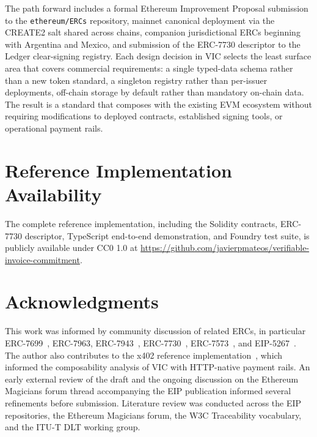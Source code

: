 \documentclass[11pt,a4paper]{article}
\begin{document}
The path forward includes a formal Ethereum Improvement Proposal submission to the \texttt{ethereum/ERCs} repository, mainnet canonical deployment via the CREATE2 salt shared across chains, companion jurisdictional ERCs beginning with Argentina and Mexico, and submission of the ERC-7730 descriptor to the Ledger clear-signing registry. Each design decision in VIC selects the least surface area that covers commercial requirements: a single typed-data schema rather than a new token standard, a singleton registry rather than per-issuer deployments, off-chain storage by default rather than mandatory on-chain data. The result is a standard that composes with the existing EVM ecosystem without requiring modifications to deployed contracts, established signing tools, or operational payment rails.

\section*{Reference Implementation Availability}

The complete reference implementation, including the Solidity contracts, ERC-7730 descriptor, TypeScript end-to-end demonstration, and Foundry test suite, is publicly available under CC0 1.0 at \url{https://github.com/javierpmateos/verifiable-invoice-commitment}.

\section*{Acknowledgments}

This work was informed by community discussion of related ERCs, in particular ERC-7699~\cite{erc7699}, ERC-7963, ERC-7943~\cite{erc7943}, ERC-7730~\cite{erc7730}, ERC-7573~\cite{erc7573}, and EIP-5267~\cite{eip5267}. The author also contributes to the x402 reference implementation~\cite{x402}, which informed the composability analysis of VIC with HTTP-native payment rails. An early external review of the draft and the ongoing discussion on the Ethereum Magicians forum thread accompanying the EIP publication informed several refinements before submission. Literature review was conducted across the EIP repositories, the Ethereum Magicians forum, the W3C Traceability vocabulary, and the ITU-T DLT working group.
\end{document}
